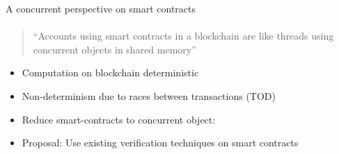 
\begin{frame}{A concurrent perspective on smart 
	contracts}
    \framesubtitle{\cite{bib:concurrent-perspective}}

\begin{quote}
``Accounts using smart contracts in a blockchain are like threads using concurrent
objects in shared memory''
\end{quote}

\begin{itemize}
	\item Computation on blockchain \alert{deterministic}
	\item \alert{Non-determinism} due to races between transactions (TOD)
	\item Reduce smart-contracts to concurrent object:
	\item Proposal: Use existing verification techniques on smart contracts
\end{itemize}


\end{frame}
